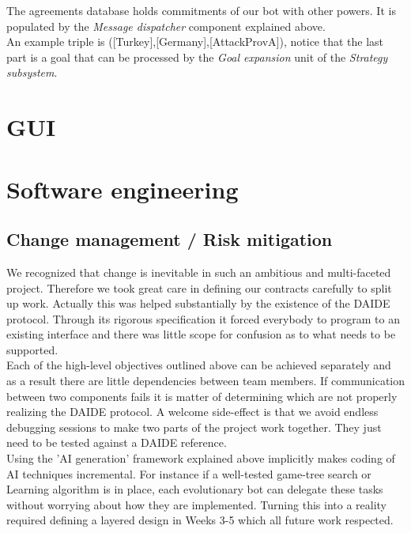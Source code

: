 \documentclass[pdftex,11pt,a4paper]{report}
\begin{document}
The agreements database holds commitments of our bot with 
other powers. It is populated by the \textit{Message dispatcher}
component explained above. \\

An example triple is ([Turkey],[Germany],[AttackProvA]),
notice that the last part is a goal that can be processed by the
\textit{Goal expansion} unit of the \textit{Strategy subsystem}.



\chapter{GUI}



\pagebreak

\chapter{Software engineering}

\section{Change management / Risk mitigation}
We recognized that change is inevitable in such an ambitious and
multi-faceted project. Therefore we took great care in defining our
contracts carefully to split up work. Actually this was helped
substantially by the existence of the DAIDE protocol. Through its
rigorous specification it forced everybody to program to an existing
interface and there was little scope for confusion as to what needs to
be supported.  \\ Each of the high-level objectives outlined above can
be achieved separately and as a result there are little dependencies
between team members.  If communication between two components fails
it is matter of determining which are not properly realizing the DAIDE
protocol. A welcome side-effect is that we avoid endless debugging
sessions to make two parts of the project work together. They just
need to be tested against a DAIDE reference.  \\ Using the 'AI
generation' framework explained above implicitly makes coding of AI
techniques incremental. For instance if a well-tested game-tree search
or Learning algorithm is in place, each evolutionary bot can delegate
these tasks without worrying about how they are implemented. Turning
this into a reality required defining a layered design in Weeks 3-5
which all future work respected.  \\
\end{document}

